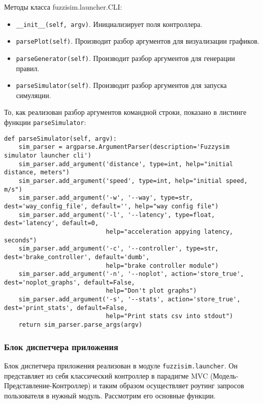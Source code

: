 Методы класса fuzzisim.launcher.CLI:
\begin{itemize}
	\item  \lstinline!__init__(self, argv)!. Инициализирует поля контроллера.
	\item  \lstinline!parsePlot(self)!.  Производит разбор аргументов для визуализации графиков.
	\item  \lstinline!parseGenerator(self)!.  Производит разбор аргументов для генерации правил.
	\item  \lstinline!parseSimulator(self)!.  Производит разбор аргументов для запуска симуляции.
\end{itemize}

То, как реализован разбор аргументов командной строки, показано в листинге функции \lstinline!parseSimulator!:

\begin{lstlisting}[style=pythonstyle,caption={ }, label=lst:func:1]
def parseSimulator(self, argv):
	sim_parser = argparse.ArgumentParser(description='Fuzzysim simulator launcher cli')
	sim_parser.add_argument('distance', type=int, help="initial distance, meters")
	sim_parser.add_argument('speed', type=int, help="initial speed, m/s")
	sim_parser.add_argument('-w', '--way', type=str, dest='way_config_file', default='', help="way config file")
	sim_parser.add_argument('-l', '--latency', type=float, dest='latency', default=0,
							help="acceleration appying latency, seconds")
	sim_parser.add_argument('-c', '--controller', type=str, dest='brake_controller', default='dumb',
							help="brake controller module")
	sim_parser.add_argument('-n', '--noplot', action='store_true', dest='noplot_graphs', default=False,
							help="Don't plot graphs")
	sim_parser.add_argument('-s', '--stats', action='store_true', dest='print_stats', default=False,
							help="Print stats csv into stdout")
	return sim_parser.parse_args(argv)
\end{lstlisting}



\subsubsection{Блок диспетчера приложения }


Блок диспетчера приложения реализован в модуле \lstinline!fuzzisim.launcher!. Он представляет из себя классический контроллер в парадигме MVC (Модель-Представление-Контроллер) и таким образом осуществляет роутинг запросов пользователя в нужный модуль. Рассмотрим его основные функции.

